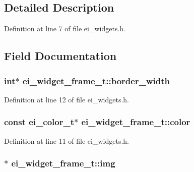 \subsection{Detailed Description}


Definition at line 7 of file ei\-\_\-widgets.\-h.



\subsection{Field Documentation}
\hypertarget{structei__widget__frame__t_a0b242994ad47f437b25e53106bc4726b}{
\subsubsection[{border\-\_\-width}]{\setlength{\rightskip}{0pt plus 5cm}int$\ast$ ei\-\_\-widget\-\_\-frame\-\_\-t\-::border\-\_\-width}}\label{structei__widget__frame__t_a0b242994ad47f437b25e53106bc4726b}


Definition at line 12 of file ei\-\_\-widgets.\-h.

\hypertarget{structei__widget__frame__t_a0e34c2b62115ecf31f7f8bb6219005ce}{
\subsubsection[{color}]{\setlength{\rightskip}{0pt plus 5cm}const {\bf ei\-\_\-color\-\_\-t}$\ast$ ei\-\_\-widget\-\_\-frame\-\_\-t\-::color}}\label{structei__widget__frame__t_a0e34c2b62115ecf31f7f8bb6219005ce}


Definition at line 11 of file ei\-\_\-widgets.\-h.

\hypertarget{structei__widget__frame__t_a9780a39c2cd0e785af1905932082c71c}{
\subsubsection[{img}]{$\ast$ ei\-\_\-widget\-\_\-frame\-\_\-t\-::img}}\label{structei__widget__frame__t_a9780a39c2cd0e785af1905932082c71c}


